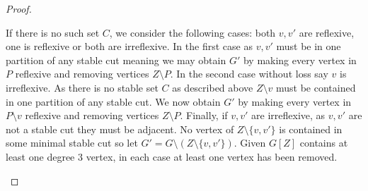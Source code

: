 \documentclass[a4paper,UKenglish,cleveref, autoref,thm-restate]{lipics-v2021}
\begin{document}
\begin{proof}
\begin{itemize}
        If there is no such set $C$, we consider the following cases: both $v,v'$ are reflexive, one is reflexive or both are irreflexive. In the first case as $v,v'$ must be in one partition of any stable cut meaning we may obtain $G'$ by making every vertex in $P$ reflexive and removing vertices $Z \setminus P$. In the second case without loss say $v$ is irreflexive. As there is no stable set $C$ as described above $Z \setminus v$ must be contained in one partition of any stable cut. We now obtain $G'$ by making every vertex in $P \setminus v$ reflexive and removing vertices $Z \setminus P$. Finally, if $v, v'$ are irreflexive, as $v,v'$ are not a stable cut they must be adjacent. No vertex of $Z \setminus \{v,v'\}$ is contained in some minimal stable cut so let $G' =G \setminus (Z \setminus \{v,v'\})$. Given $G[Z]$ contains at least one degree 3 vertex, in each case at least one vertex has been removed.
    \end{itemize}
\end{proof}
\end{document}
